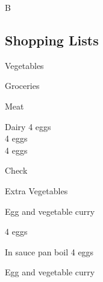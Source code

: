 		\begin{menu}{B}
    
    \subsection*{Shopping Lists}
      \begin{shoppinglist}{Vegetables}
      \end{shoppinglist}%
      \begin{shoppinglist}{Groceries}
      \end{shoppinglist}%
      \par\vfil %
      \begin{shoppinglist}{Meat}
      \end{shoppinglist}%
      \begin{shoppinglist}{Dairy}
      4  eggs \\ 
      4  eggs \\ 
      4  eggs \\ 
      \end{shoppinglist}%
      \par\vfil %
      \vfil\clearpage %
      \begin{shoppinglist}{Check}
      \end{shoppinglist}%
      \begin{shoppinglist}{Extra Vegetables}
      \end{shoppinglist}%
      \par\vfil %
    \vfil\clearpage
  
    \begin{recipe}{2}{Egg and vegetable curry}%
    
		\begin{ingredients}
		4  eggs  \\
	
		\end{ingredients}
	
    \begin{instructions}
    \item 
				In sauce pan boil
				4   eggs
    \end{instructions}
    \end{recipe}%
  
    \begin{recipe}{2}{Egg and vegetable curry}%
    

\end{recipe}
\end{menu}
